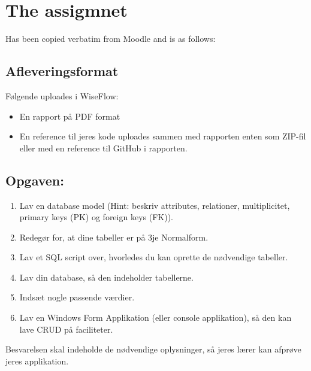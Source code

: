 \section{The assigmnet}
Has been copied verbatim from Moodle and is as follows:

\subsection{Afleveringsformat}
Følgende uploades i WiseFlow:
\begin{itemize}
    \item En rapport på PDF format
    \item En reference til jeres kode uploades sammen med rapporten enten som ZIP-fil eller med en reference til GitHub i rapporten.
\end{itemize}

\subsection{Opgaven:}
\begin{enumerate}
    \item Lav en database model (Hint: beskriv attributes, relationer, multiplicitet, primary keys (PK) og foreign keys (FK)).
    \item Redegør for, at dine tabeller er på 3je Normalform.
    \item Lav et SQL script over, hvorledes du kan oprette de nødvendige tabeller.
    \item Lav din database, så den indeholder tabellerne.
    \item Indsæt nogle passende værdier.
    \item Lav en Windows Form Applikation (eller console applikation), så den kan lave CRUD på faciliteter.
\end{enumerate}

Besvarelsen skal indeholde de nødvendige oplysninger, så jeres lærer kan afprøve jeres applikation.
